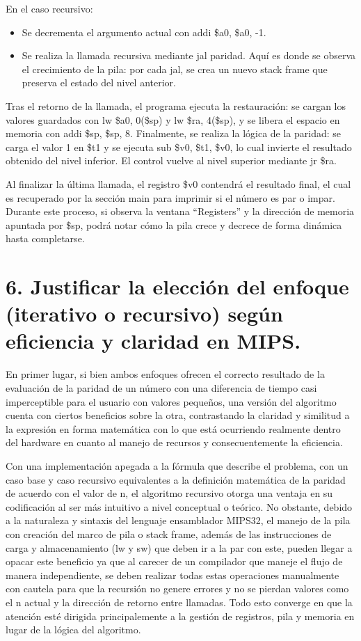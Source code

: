 \documentclass[12pt, letterpaper]{article}
\begin{document}
En el caso recursivo:
\begin{itemize}
    \item Se decrementa el argumento actual con addi \$a0, \$a0, -1.
    \item Se realiza la llamada recursiva mediante jal paridad. Aquí es donde se observa el crecimiento de la pila: por cada jal, se crea un nuevo stack frame que preserva el estado del nivel anterior.
\end{itemize}

Tras el retorno de la llamada, el programa ejecuta la restauración: se cargan los valores guardados con lw \$a0, 0(\$sp) y lw \$ra, 4(\$sp), y se libera el espacio en memoria con addi \$sp, \$sp, 8. Finalmente, se realiza la lógica de la paridad: se carga el valor 1 en \$t1 y se ejecuta sub \$v0, \$t1, \$v0, lo cual invierte el resultado obtenido del nivel inferior. El control vuelve al nivel superior mediante jr \$ra.

Al finalizar la última llamada, el registro \$v0 contendrá el resultado final, el cual es recuperado por la sección main para imprimir si el número es par o impar. Durante este proceso, si observa la ventana “Registers” y la dirección de memoria apuntada por \$sp, podrá notar cómo la pila crece y decrece de forma dinámica hasta completarse.

\newpage
\section*{6. Justificar la elección del enfoque (iterativo o recursivo) según eficiencia y claridad en MIPS.}

En primer lugar, si bien ambos enfoques ofrecen el correcto resultado de la evaluación de la paridad de un número con una diferencia de tiempo casi imperceptible para el usuario con valores pequeños, una versión del algoritmo cuenta con ciertos beneficios sobre la otra, contrastando la claridad y similitud a la expresión en forma matemática con lo que está ocurriendo realmente dentro del hardware en cuanto al manejo de recursos y consecuentemente la eficiencia.

Con una implementación apegada a la fórmula que describe el problema, con un caso base y caso recursivo equivalentes a la definición matemática de la paridad de acuerdo con el valor de n, el algoritmo recursivo otorga una ventaja en su codificación al ser más intuitivo a nivel conceptual o teórico. No obstante, debido a la naturaleza y sintaxis del lenguaje ensamblador MIPS32, el manejo de la pila con creación del marco de pila o stack frame, además de las instrucciones de carga y almacenamiento (lw y sw) que deben ir a la par con este, pueden llegar a opacar este beneficio ya que al carecer de un compilador que maneje el flujo de manera independiente, se deben realizar todas estas operaciones manualmente con cautela para que la recursión no genere errores y no se pierdan valores como el n actual y la dirección de retorno entre llamadas. Todo esto converge en que la atención esté dirigida principalemente a la gestión de registros, pila y memoria en lugar de la lógica del algoritmo. 
\end{document}
